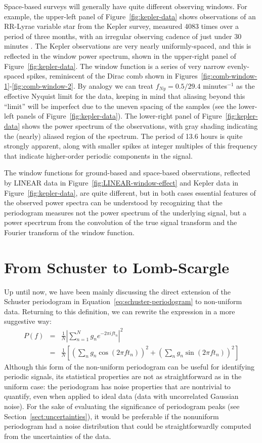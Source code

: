 \documentclass[preprint]{aastex}
\newcommand{\fig}[1]{Figure~\ref{fig:#1}}
\newcommand{\figs}[2]{Figures~\ref{fig:#1}-\ref{fig:#2}}
\newcommand{\Eq}[1]{Equation~\ref{eq:#1}}
\newcommand{\eq}[1]{\Eq{#1}}
\newcommand{\eqlabel}[1]{\label{eq:#1}}
\newcommand{\Sect}[1]{Section~\ref{sect:#1}}
\newcommand{\sect}[1]{\Sect{#1}}
\newcommand{\sectlabel}[1]{\label{sect:#1}}
\begin{document}
Space-based surveys will generally have quite different observing windows.
For example, the upper-left panel of \fig{kepler-data}
shows observations of an RR-Lyrae variable star from the Kepler survey,
measured 4083 times over a period of three months,
with an irregular observing cadence of just under 30 minutes
 \citep[For deeper discussion of these observations, see][]{Kolenberg2010}.
The Kepler observations are very nearly uniformly-spaced, and this is reflected
in the window power spectrum, shown in the upper-right panel of
\fig{kepler-data}.
The window function is a series of very narrow evenly-spaced spikes,
reminiscent of the Dirac comb shown in \figs{comb-window-1}{comb-window-2}.
By analogy we can treat $f_{Ny} = 0.5/29.4$ minutes$^{-1}$ as the
effective Nyquist limit for the data, keeping in mind that aliasing beyond this
``limit'' will be imperfect due to the uneven spacing of the samples
(see the lower-left panels of \fig{kepler-data}).
The lower-right panel of \fig{kepler-data} shows the power spectrum of the
observations, with gray shading indicating the (nearly) aliased region
of the spectrum.
The period of 13.6 hours is quite strongly apparent, along with smaller spikes
at integer multiples of this frequency that indicate higher-order periodic
components in the signal.

The window functions for ground-based and space-based observations, reflected
by LINEAR data in \fig{LINEAR-window-effect} and Kepler data in
\fig{kepler-data}, are quite different, but in both cases essential features
of the observed power spectra can be understood by recognizing that the
periodogram measures
not the power spectrum of the underlying signal, but a power specrtrum from
the convolution of the true signal transform and the Fourier transform of
the window function.


\section{From Schuster to Lomb-Scargle}
\sectlabel{schuster-to-lomb-scargle}

Up until now, we have been mainly discussing the direct extension of the
Schuster periodogram in \eq{schuster-periodogram} to non-uniform data.
Returning to this definition, we can rewrite the expression in a more
suggestive way:
\begin{eqnarray}
  P(f)
  &=& \frac{1}{N}\left|\sum_{n=1}^N g_n e^{-2\pi i f t_n} \right|^2 \nonumber\\
  &=& \frac{1}{N}\left[
    \left(\sum_n g_n \cos(2\pi f t_n)\right)^2
    + \left(\sum_n g_n \sin(2\pi f t_n)\right)^2
    \right]
  \eqlabel{classical-periodogram}
\end{eqnarray}
Although this form of the non-uniform periodogram can be useful for identifying
periodic signals, its statistical properties are not as straightforward as in
the uniform case: the periodogram has noise properties that are nontrivial
to quantify, even when applied to ideal data (data with uncorrelated
Gaussian noise).
For the sake of evaluating the significance of periodogram peaks
(see \sect{uncertainties}), it would be preferable if the nonuniform
periodogram had a noise distribution that could be
straightforwardly computed from the uncertainties of the data.
\end{document}
